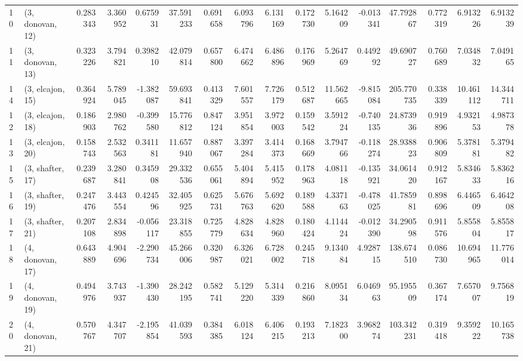\begin{tabular}{llrrrrrrrrrrrrrr}
10 &  (3, donovan, 12) &   0.283343 &  3.360952 &  0.675931 &   37.591233 &  0.691658 &   6.093796 &   6.131169 &  0.172730 &   5.164209 & -0.013341 &   47.792867 &  0.772319 &   6.913226 &   6.913239 \\
11 &  (3, donovan, 13) &   0.323226 &  3.794821 &  0.398210 &   42.079814 &  0.657800 &   6.474662 &   6.486896 &  0.176969 &   5.264769 &  0.449292 &   49.690727 &  0.760689 &   7.034832 &   7.049165 \\
14 &  (3, elcajon, 15) &   0.364924 &  5.789045 & -1.382087 &   59.693841 &  0.413329 &   7.601557 &   7.726179 &  0.512687 &  11.562665 & -9.815084 &  205.770735 &  0.338339 &  10.461112 &  14.344711 \\
12 &  (3, elcajon, 18) &   0.186903 &  2.980762 & -0.399580 &   15.776812 &  0.847124 &   3.951854 &   3.972003 &  0.159542 &   3.591224 & -0.740135 &   24.873936 &  0.919896 &   4.932153 &   4.987378 \\
13 &  (3, elcajon, 20) &   0.158743 &  2.532563 &  0.341181 &   11.657940 &  0.887067 &   3.397284 &   3.414373 &  0.168669 &   3.794766 & -0.118274 &   28.938823 &  0.906809 &   5.378181 &   5.379482 \\
15 &  (3, shafter, 17) &   0.239687 &  3.280841 &  0.345908 &   29.332536 &  0.655061 &   5.404894 &   5.415952 &  0.178963 &   4.081118 & -0.135921 &   34.061420 &  0.912167 &   5.834633 &   5.836216 \\
16 &  (3, shafter, 19) &   0.247476 &  3.443554 &  0.424596 &   32.405925 &  0.625731 &   5.676763 &   5.692620 &  0.189588 &   4.337163 & -0.478025 &   41.785981 &  0.898696 &   6.446509 &   6.464208 \\
17 &  (3, shafter, 21) &   0.207108 &  2.834898 & -0.056117 &   23.318855 &  0.725779 &   4.828634 &   4.828960 &  0.180424 &   4.114424 & -0.012390 &   34.290598 &  0.911576 &   5.855804 &   5.855817 \\
18 &  (4, donovan, 17) &   0.643889 &  4.904696 & -2.290734 &   45.266006 &  0.320987 &   6.326021 &   6.728002 &  0.245718 &   9.134084 &  4.928715 &  138.674510 &  0.086730 &  10.694965 &  11.776014 \\
19 &  (4, donovan, 19) &   0.494976 &  3.743937 & -1.390430 &   28.242195 &  0.582741 &   5.129220 &   5.314339 &  0.216860 &   8.095134 &  6.046963 &   95.195509 &  0.367174 &   7.657007 &   9.756819 \\
20 &  (4, donovan, 21) &   0.570767 &  4.347707 & -2.195854 &   41.039593 &  0.384385 &   6.018124 &   6.406215 &  0.193213 &   7.182300 &  3.968274 &  103.342231 &  0.319418 &   9.359222 &  10.165738 \\

\end{tabular}
